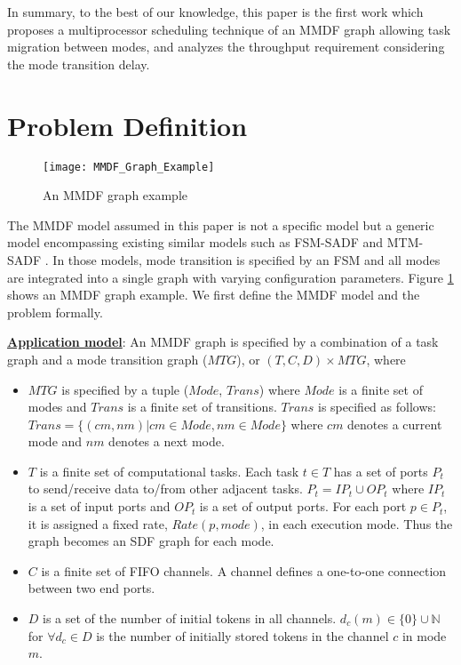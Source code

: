 \documentclass[prodmode,acmtecs]{acmsmall}
\begin{document}
In summary, to the best of our knowledge, this paper is the first work which proposes a multiprocessor scheduling technique of an MMDF graph allowing task migration between modes, and analyzes the throughput requirement considering the mode transition delay.

\section{Problem Definition}
\label{Section:Problem Definition}

\begin{figure} [ht]
\centerline{\texttt{[image: MMDF\_Graph\_Example]}}
\caption{An MMDF graph example}
\label{Figure:MMDF Graph Example}
\end{figure}

The MMDF model assumed in this paper is not a specific model but a generic model encompassing existing similar models such as FSM-SADF \cite{Stuijk:2008} and MTM-SADF \cite{Jung:2014}. In those models, mode transition is specified by an FSM and all modes are integrated into a single graph with varying configuration parameters. Figure \ref{Figure:MMDF Graph Example} shows an MMDF graph example. We first define the MMDF model and the problem formally.

\vspace{0.3cm}

\textbf{\underline{Application model}}: An MMDF graph is specified by a combination of a task graph and a mode transition graph ($MTG$), or $(T, C, D) \times MTG$, where

\begin{itemize}
  \item $MTG$ is specified by a tuple ($Mode$, $Trans$) where $Mode$ is a finite set of modes and $Trans$ is a finite set of transitions. $Trans$ is specified as follows: $Trans =\lbrace (cm,nm) | cm \in Mode, nm \in Mode \rbrace$ where $cm$ denotes a current mode and $nm$ denotes a next mode.
  \vspace{0.2cm}
  \item $T$ is a finite set of computational tasks. Each task $t \in T$ has a set of ports $P_t$ to send/receive data to/from other adjacent tasks. $P_t = IP_t \cup OP_t$ where $IP_t$ is a set of input ports and $OP_t$ is a set of output ports. For each port $p \in P_t$, it is assigned a fixed rate, $Rate(p, mode)$, in each execution mode. Thus the graph becomes an SDF graph for each mode.
  \vspace{0.2cm}
  \item $C$ is a finite set of FIFO channels. A channel defines a one-to-one connection between two end ports.
  \vspace{0.2cm}
  \item $D$ is a set of the number of initial tokens in all channels. $d_c (m) \in \lbrace 0 \rbrace \cup \mathbb{N}$ for $\forall d_c \in D$ is the number of initially stored tokens in the channel $c$ in mode $m$.
\end{itemize}
\end{document}
